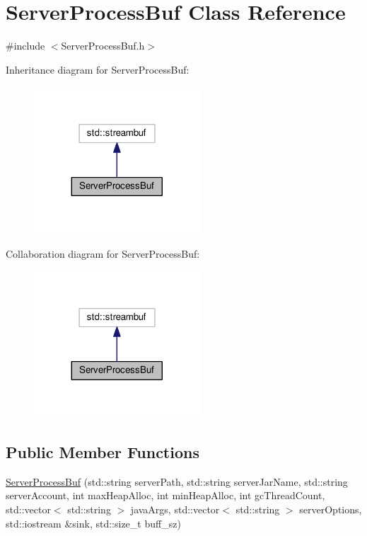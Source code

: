 \hypertarget{class_server_process_buf}{}\section{Server\+Process\+Buf Class Reference}
\label{class_server_process_buf}


{\ttfamily \#include $<$Server\+Process\+Buf.\+h$>$}



Inheritance diagram for Server\+Process\+Buf\+:
\nopagebreak
\begin{figure}[H]
\begin{center}
\leavevmode
\includegraphics[width=176pt]{class_server_process_buf__inherit__graph}
\end{center}
\end{figure}


Collaboration diagram for Server\+Process\+Buf\+:
\nopagebreak
\begin{figure}[H]
\begin{center}
\leavevmode
\includegraphics[width=176pt]{class_server_process_buf__coll__graph}
\end{center}
\end{figure}
\subsection*{Public Member Functions}
\begin{DoxyCompactItemize}
\item 
\hyperlink{class_server_process_buf_aeda18d47994dc471a6bdc469b3394fb4}{Server\+Process\+Buf} (std\+::string server\+Path, std\+::string server\+Jar\+Name, std\+::string server\+Account, int max\+Heap\+Alloc, int min\+Heap\+Alloc, int gc\+Thread\+Count, std\+::vector$<$ std\+::string $>$ java\+Args, std\+::vector$<$ std\+::string $>$ server\+Options, std\+::iostream \&sink, std\+::size\+\_\+t buff\+\_\+sz)
\end{DoxyCompactItemize}


